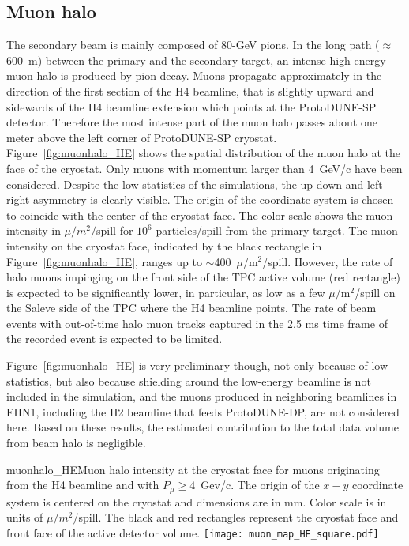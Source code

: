 \subsection{Muon halo}
The secondary beam is mainly composed of 80-GeV pions. In the long path ($\approx$ 600~m) between the primary and the secondary target,
 an intense high-energy muon halo is produced by pion decay. Muons propagate approximately in the direction of the first section of the H4 beamline,  that is slightly upward  and sidewards of the H4 beamline extension which points at the ProtoDUNE-SP detector.  
 Therefore the most intense part of the muon halo passes about one meter above the left corner of ProtoDUNE-SP cryostat. 
Figure~\ref{fig:muonhalo_HE} shows the spatial distribution of the muon halo at the face of the cryostat. Only muons with momentum larger than 4~GeV/c have been considered. Despite the low statistics of the simulations, the up-down and left-right asymmetry is clearly visible. 
The origin of the coordinate system is chosen to coincide with the center of the cryostat face. The color scale shows the muon intensity in  $\mu/m^2/$spill for $10^6$ particles/spill from the primary target. The muon intensity on the cryostat face, indicated by the black rectangle in Figure~\ref{fig:muonhalo_HE}, ranges up to $\sim$400~$\mu$/m$^2$/spill. However, the rate of halo muons impinging on the front side of the TPC active volume (red rectangle) is expected to be significantly lower, in particular, as low as a few $\mu$/m$^2$/spill on the Saleve side of the TPC 
where the H4 beamline points. The rate of beam events with out-of-time halo muon tracks captured in the 2.5 ms time frame of the recorded event is expected to be limited.

Figure~\ref{fig:muonhalo_HE}  is very preliminary though, not only because of low statistics, but also because shielding around the low-energy beamline is not included in the simulation, and the muons produced in neighboring beamlines in EHN1, including the H2 beamline that feeds ProtoDUNE-DP, are not considered here. Based on these results, the estimated contribution to the total data volume from beam halo is negligible.
\begin{cdrfigure}{muonhalo_HE}{Muon halo intensity at the cryostat face for muons originating from the H4 beamline and with $P_\mu  \ge 4$~Gev/c. The origin of the $x-y$ coordinate system is centered on the cryostat and dimensions are in mm. Color scale is in units of $\mu/m^2/$spill. The black and red rectangles represent the cryostat face and front face of the active detector volume.}
\texttt{[image: muon\_map\_HE\_square.pdf]}
\end{cdrfigure}
